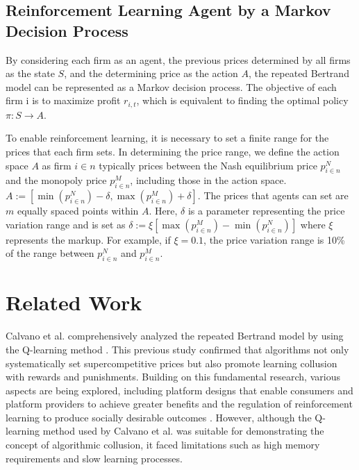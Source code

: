 \documentclass[runningheads]{llncs}
\begin{document}
\subsection{Reinforcement Learning Agent by a Markov Decision Process}
    By considering each firm as an agent, the previous prices determined by all firms as the state \( S \), and the determining price as the action \( A \), the repeated Bertrand model can be represented as a Markov decision process.
    The objective of each firm i is to maximize profit $r_{i,t}$, which is equivalent to finding the optimal policy \( \pi: S \to A \).
    
    To enable reinforcement learning, it is necessary to set a finite range for the prices that each firm sets.
    In determining the price range, we define the action space \( A \) 
    as firm \( i \in n \) typically prices between the Nash equilibrium price \( p_{i \in n}^N \) and the monopoly price \( p_{i \in n}^M \), including those in the action space.
        $A := \left[ \min (p_{i \in n}^N) - \delta , \max (p_{i \in n}^M) + \delta \right]$. 
    The prices that agents can set are $m$ equally spaced points within $A$.
    Here, $ \delta $ is a parameter representing the price variation range and is set as
    $\delta := \xi \left[ \max (p_{i \in n}^M) - \min (p_{i \in n}^N) \right]$
    where $\xi$ represents the markup.
    For example, if $ \xi = 0.1 $, the price variation range is 10\% of the range between $p_{i \in n}^N$ and $ p_{i \in n}^M $.


\section{Related Work}
Calvano et al. \cite{calvano2020a} comprehensively analyzed the repeated Bertrand model by using the Q-learning method \cite{watkins1992}. This previous study confirmed that algorithms not only systematically set supercompetitive prices but also promote learning collusion with rewards and punishments. Building on this fundamental research, various aspects are being explored, including platform designs that enable consumers and platform providers to achieve greater benefits \cite{johnson2020} and the regulation of reinforcement learning to produce socially desirable outcomes \cite{Abada2020}. However, although the Q-learning method used by Calvano et al. \cite{calvano2020a} was suitable for demonstrating the concept of algorithmic collusion, it faced limitations such as high memory requirements and slow learning processes.
\end{document}
